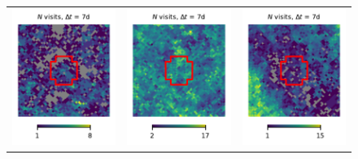 \documentclass[preprintm,linenumbers]{aastex631}
\begin{document}
\begin{figure}
\begin{tabular}{  c c c}
				\includegraphics{results/skymaps_cutout/skymaps_cutout_first_year_one_snap_v4_0_10yrs_db_noDD_noTwi_tscale-7_nside-256_doAllTemplateMetrics_reduceCount_r_NES_noDD_noTwi.pdf} &
				\includegraphics{results/skymaps_cutout/skymaps_cutout_first_year_one_snap_v4_0_10yrs_db_noDD_noTwi_tscale-7_nside-256_doAllTemplateMetrics_reduceCount_r_WFD_noDD_noTwi.pdf} &
				\includegraphics{results/skymaps_cutout/skymaps_cutout_first_year_one_snap_v4_0_10yrs_db_noDD_noTwi_tscale-7_nside-256_doAllTemplateMetrics_reduceCount_r_GP_noDD_noTwi.pdf} \\

\end{tabular}
\end{figure}
\end{document}
